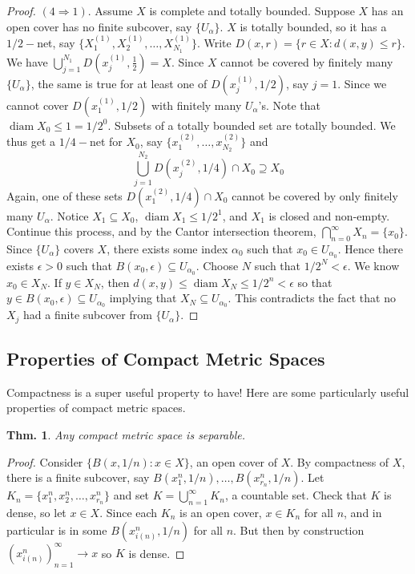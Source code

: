 \documentclass[12pt, a4paper]{book}
\DeclareMathOperator{\diam}{diam}
\newtheorem{theorem}{Thm.}[section]
\theoremstyle{nonumberplain}
\newtheorem{proof}{Proof}
\begin{document}
\begin{proof}
    $(4\Rightarrow 1)$. Assume $X$ is complete and totally bounded. Suppose $X$ has an open cover has no finite subcover,
    say $\{U_\alpha\}$. $X$ is totally bounded, so it has a $1/2-$net, say $\{X_1^{(1)},X_2^{(1)},\ldots,X_{N_1}^{(1)}\}$.
    Write $D(x,r)=\{r\in X:d(x,y)\leq r\}$. We have $\bigcup_{j=1}^{N_1} D\left(x_j^{(1)},\frac{1}{2}\right)=X$. Since
    $X$ cannot be covered by finitely many $\{U_{\alpha}\}$, the same is true for at least one of $D(x_j^{(1)},1/2)$,
    say $j=1$. Since we cannot cover $D(x_1^{(1)},1/2)$ with finitely many $U_\alpha$'s. Note that $\diam X_0\leq 1=1/2^0$.
    Subsets of a totally bounded set are totally bounded. We thus get a $1/4-$net for $X_0$, say $\{x_1^{(2)},\ldots,x_{N_2}^{(2)}\}$
    and
    \[\bigcup_{j=1}^{N_2} D(x_j^{(2)},1/4)\cap X_0\supseteq X_0\]
    Again, one of these sets $D(x_1^{(2)},1/4)\cap X_0$ cannot be covered by only finitely many $U_{\alpha}$. Notice $X_1\subseteq X_0$,
    $\diam X_1\leq 1/2^1$, and $X_1$ is closed and non-empty. Continue this process, and by the Cantor intersection theorem,
    $\bigcap_{n=0}^\infty X_n=\{x_0\}$. Since $\{U_\alpha\}$ covers $X$, there exists some index $\alpha_0$ such that
    $x_0\in U_{\alpha_0}$. Hence there exists $\epsilon>0$ such that $B(x_0,\epsilon)\subseteq U_{\alpha_0}$. Choose $N$
    such that $1/2^N<\epsilon$. We know $x_0\in X_N$. If $y\in X_N$, then $d(x,y)\leq\diam X_N\leq1/2^n<\epsilon$ so that
    $y\in B(x_0,\epsilon)\subseteq U_{\alpha_0}$ implying that $X_N\subseteq U_{\alpha_0}$. This contradicts the fact that no $X_j$
    had a finite subcover from $\{U_\alpha\}$.
\end{proof}
\subsection{Properties of Compact Metric Spaces}
Compactness is a super useful property to have!
Here are some particularly useful properties of compact metric spaces.
\begin{theorem}
    Any compact metric space is separable.
\end{theorem}
\begin{proof}
    Consider $\{B(x,1/n):x\in X\}$, an open cover of $X$.
    By compactness of $X$, there is a finite subcover, say $B(x_1^n,1/n),\ldots,B(x_{r_n}^n,1/n)$.
    Let $K_n=\{x_1^n,x_2^n,\ldots,x_{r_n}^n\}$ and set $K=\bigcup\limits_{n=1}^\infty K_n$, a countable set.
    Check that $K$ is dense, so let $x\in X$.
    Since each $K_n$ is an open cover, $x\in K_n$ for all $n$, and in particular is in some $B(x_{i(n)}^n,1/n)$ for all $n$.
    But then by construction $(x_{i(n)}^n)_{n=1}^\infty\to x$ so $K$ is dense.
\end{proof}
\end{document}
